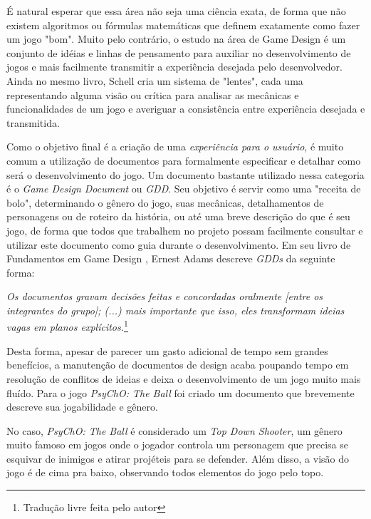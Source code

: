 É natural esperar que essa área não seja uma ciência exata, de forma que não existem algoritmos ou fórmulas matemáticas que definem exatamente como fazer um jogo "bom". Muito pelo contrário, o estudo na área de Game Design é um conjunto de idéias e linhas de pensamento para auxiliar no desenvolvimento de jogos e mais facilmente transmitir a experiência desejada pelo desenvolvedor. Ainda no mesmo livro\cite{jessegamedesign}, Schell cria um sistema de "lentes", cada uma representando alguma visão ou crítica para analisar as mecânicas e funcionalidades de um jogo e averiguar a consistência entre experiência desejada e transmitida.

Como o objetivo final é a criação de uma \textit{experiência para o usuário}, é muito comum a utilização de documentos para formalmente especificar e detalhar como será o desenvolvimento do jogo. Um documento bastante utilizado nessa categoria é o \textit{Game Design Document} ou \textit{GDD}. Seu objetivo é servir como uma "receita de bolo", determinando o gênero do jogo, suas mecânicas, detalhamentos de personagens ou de roteiro da história, ou até uma breve descrição do que é seu jogo, de forma que todos que trabalhem no projeto possam facilmente consultar e utilizar este documento como guia durante o desenvolvimento. Em seu livro de Fundamentos em Game Design \cite{ernestgamedesign}, Ernest Adams descreve \textit{GDDs} da seguinte forma:

\begin{displayquote}
  \textit{Os documentos gravam decisões feitas e concordadas oralmente [entre os integrantes do grupo]; (...) mais importante que isso, eles transformam ideias vagas em planos explícitos.}\footnote{Tradução livre feita pelo autor}
\end{displayquote}

Desta forma, apesar de parecer um gasto adicional de tempo sem grandes benefícios, a manutenção de documentos de design acaba poupando tempo em resolução de conflitos de ideias e deixa o desenvolvimento de um jogo muito mais fluído. Para o jogo \textit{PsyChO: The Ball} foi criado um documento que brevemente descreve sua jogabilidade e gênero.

No caso, \textit{PsyChO: The Ball} é considerado um \textit{Top Down Shooter}, um gênero muito famoso em jogos onde o jogador controla um personagem que precisa se esquivar de inimigos e atirar projéteis para se defender. Além disso, a visão do jogo é de cima pra baixo, observando todos elementos do jogo pelo topo.

